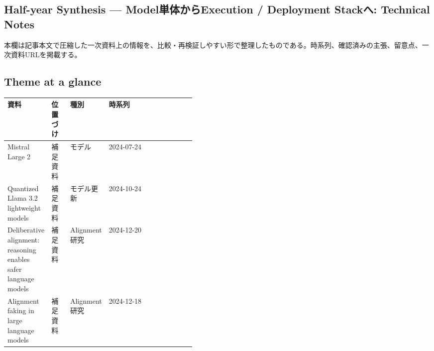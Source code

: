 \subsection*{Half-year Synthesis — Model単体からExecution / Deployment Stackへ: Technical Notes}
本欄は記事本文で圧縮した一次資料上の情報を、比較・再検証しやすい形で整理したものである。時系列、確認済みの主張、留意点、一次資料URLを掲載する。
\smallskip
{}\par
\medskip
\subsection*{Theme at a glance}
\begin{center}
\footnotesize
\begin{tabularx}{\linewidth}{@{}p{0.20\linewidth}p{0.10\linewidth}p{0.14\linewidth}X@{}}
\toprule
資料 & 位置づけ & 種別 & 時系列 \\
\midrule
Mistral Large 2 & 補足資料 & モデル & 2024-07-24         \\
Quantized Llama 3.2 lightweight models & 補足資料 & モデル更新 & 2024-10-24         \\
Deliberative alignment: reasoning enables safer language models & 補足資料 & Alignment研究 & 2024-12-20         \\
Alignment faking in large language models & 補足資料 & Alignment研究 & 2024-12-18         \\
\bottomrule
\end{tabularx}
\end{center}
\normalsize

